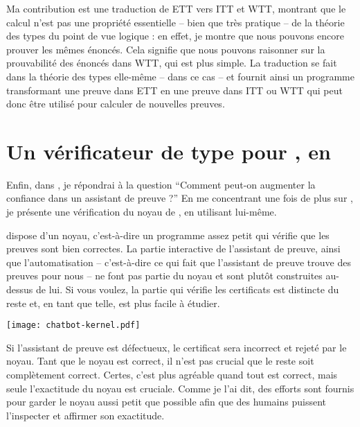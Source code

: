 Ma contribution est une traduction de \acrshort{ETT} vers \acrshort{ITT} et
\acrshort{WTT}, montrant que le calcul n'est pas une propriété essentielle --
bien que très pratique -- de la théorie des types du point de vue logique : en
effet, je montre que nous pouvons encore prouver les mêmes énoncés.
Cela signifie que nous pouvons raisonner sur la prouvabilité des énoncés dans
\acrshort{WTT}, qui est plus simple.
La traduction se fait dans la théorie des types elle-même -- dans ce cas
\Coq\xspace -- et fournit ainsi un programme transformant une preuve dans
\acrshort{ETT} en une preuve dans \acrshort{ITT} ou \acrshort{WTT} qui peut donc
être utilisé pour calculer de nouvelles preuves.

\section{Un vérificateur de type pour \Coq, en \Coq}

Enfin, dans , je répondrai à la question ``Comment
peut-on augmenter la confiance dans un assistant de preuve ?'' En me concentrant
une fois de plus sur \Coq, je présente une vérification du noyau de \Coq, en
utilisant \Coq lui-même.

\Coq dispose d'un noyau, c'est-à-dire un programme assez petit qui vérifie que
les preuves sont bien correctes. La partie interactive de l'assistant de preuve,
ainsi que l'automatisation -- c'est-à-dire ce qui fait que l'assistant de
preuve trouve des preuves pour nous -- ne font pas partie du noyau et sont
plutôt construites au-dessus de lui.
Si vous voulez, la partie qui vérifie les certificats est distincte du reste et,
en tant que telle, est plus facile à étudier.

\begin{center}
  \texttt{[image: chatbot-kernel.pdf]}
\end{center}

Si l'assistant de preuve est défectueux, le certificat sera incorrect et rejeté
par le noyau. Tant que le noyau est correct, il n'est pas crucial que le reste
soit complètement correct. Certes, c'est plus agréable quand tout est correct,
mais seule l'exactitude du noyau est cruciale.
Comme je l'ai dit, des efforts sont fournis pour garder le noyau aussi petit que
possible afin que des humains puissent l'inspecter et affirmer son exactitude.

